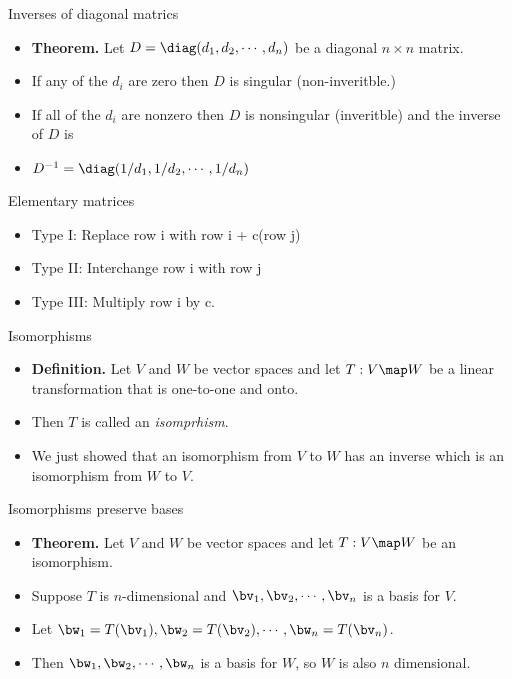 \documentclass{beamer}
\begin{document}
\begin{frame}{Inverses of diagonal matrics}

\begin{itemize}
\item \textbf{Theorem.} Let $D=\diag(d_1,d_2,\cdots,d_n)$
be a diagonal $n\times n$ matrix.
\item If any of the $d_i$ are zero then $D$ is singular (non-inveritble.)
\item If all of the $d_i$ are nonzero then $D$ is nonsingular (inveritble)
and the inverse of $D$ is
\item $D^{-1}=\diag(1/d_1,1/d_2,\cdots,1/d_n)$
\end{itemize}
\end{frame}

\begin{frame}{Elementary matrices}

\begin{itemize}
\item Type I: Replace row i with row i + c(row j)
\item Type II: Interchange row i with row j
\item Type III: Multiply row i by c.
\end{itemize}
\end{frame}


\begin{frame}{Isomorphisms}

\begin{itemize}
\item \textbf{Definition.} Let $V$ and $W$ be vector spaces and let
$T:V\map W$ be a linear transformation that is one-to-one and onto.
\item Then $T$ is called an \emph{isomprhism}.
\item We just showed that an isomorphism from $V$ to $W$ has an inverse
which is an isomorphism from $W$ to $V$.
\end{itemize}
\end{frame}
\begin{frame}{Isomorphisms preserve bases}

\begin{itemize}
\item \textbf{Theorem.} Let $V$ and $W$ be vector spaces and let
$T:V\map W$ be an isomorphism.
\item Suppose $T$ is $n$-dimensional and $\bv_1,\bv_2,\cdots,\bv_n$
is a basis for $V$.
\item Let $\bw_1=T(\bv_1),\bw_2=T(\bv_2),\cdots,\bw_n=T(\bv_n)$.
\item Then $\bw_1,\bw_2,\cdots,\bw_n$ is a basis for $W$, so $W$ is also
$n$ dimensional.
\end{itemize}
\end{frame}

\end{document}
